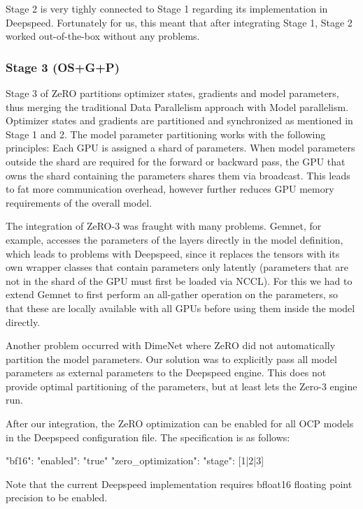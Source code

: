 Stage 2 is very tighly connected to Stage 1 regarding its implementation in Deepspeed. Fortunately 
for us, this meant that after integrating Stage 1, Stage 2 worked out-of-the-box without any problems.

\subsubsection{Stage 3 (OS+G+P)}

Stage 3 of ZeRO partitions optimizer states, gradients and model parameters, thus merging the 
traditional Data Parallelism approach with Model parallelism. Optimizer states and gradients 
are partitioned and synchronized as mentioned in Stage 1 and 2. The model parameter partitioning 
works with the following principles: Each GPU is assigned a shard of parameters. When model 
parameters outside the shard are required for the forward or backward pass, the GPU that owns 
the shard containing the parameters shares them via broadcast. This leads to fat more communication 
overhead, however further reduces GPU memory requirements of the overall model.

The integration of ZeRO-3 was fraught with many problems. Gemnet, for example, accesses the 
parameters of the layers directly in the model definition, which leads to problems with 
Deepspeed, since it replaces the tensors with its own wrapper classes that contain parameters 
only latently (parameters that are not in the shard of the GPU must first be loaded via NCCL). 
For this we had to extend Gemnet to first perform an all-gather operation on the parameters, 
so that these are locally available with all GPUs before using them inside the model directly.

Another problem occurred with DimeNet where ZeRO did not automatically partition the model 
parameters. Our solution was to explicitly pass all model parameters as external parameters 
to the Deepspeed engine. This does not provide optimal partitioning of the parameters, but 
at least lets the Zero-3 engine run.

After our integration, the ZeRO optimization can be enabled for all OCP models in the Deepspeed configuration 
file. The specification is as follows:

\begin{json}
"bf16": {
    "enabled": "true"
}
"zero_optimization": {
    "stage": [1|2|3]
}
\end{json}

Note that the current Deepspeed implementation requires bfloat16 floating point precision to be enabled. 
